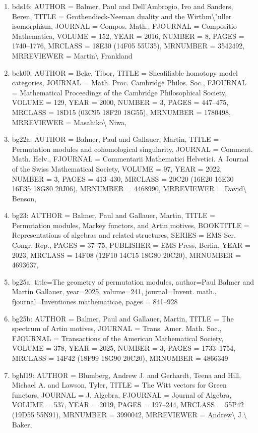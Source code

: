 \documentclass[11pt]{article}
\begin{document}
\begin{enumerate}[leftmargin=*]
  \item bds16: AUTHOR = Balmer, Paul and Dell'Ambrogio, Ivo and Sanders, Beren, TITLE = Grothendieck-Neeman duality and the Wirthm\textbackslash{}"uller isomorphism, JOURNAL = Compos. Math., FJOURNAL = Compositio Mathematica, VOLUME = 152, YEAR = 2016, NUMBER = 8, PAGES = 1740--1776, MRCLASS = 18E30 (14F05 55U35), MRNUMBER = 3542492, MRREVIEWER = Martin\textbackslash{} Frankland
  \item bek00: AUTHOR = Beke, Tibor, TITLE = Sheafifiable homotopy model categories, JOURNAL = Math. Proc. Cambridge Philos. Soc., FJOURNAL = Mathematical Proceedings of the Cambridge Philosophical Society, VOLUME = 129, YEAR = 2000, NUMBER = 3, PAGES = 447--475, MRCLASS = 18D15 (03C95 18F20 18G55), MRNUMBER = 1780498, MRREVIEWER = Masahiko\textbackslash{} Niwa,
  \item bg22a: AUTHOR = Balmer, Paul and Gallauer, Martin, TITLE = Permutation modules and cohomological singularity, JOURNAL = Comment. Math. Helv., FJOURNAL = Commentarii Mathematici Helvetici. A Journal of the Swiss Mathematical Society, VOLUME = 97, YEAR = 2022, NUMBER = 3, PAGES = 413--430, MRCLASS = 20C20 (16E20 16E30 16E35 18G80 20J06), MRNUMBER = 4468990, MRREVIEWER = David\textbackslash{} Benson,
  \item bg23: AUTHOR = Balmer, Paul and Gallauer, Martin, TITLE = Permutation modules, Mackey functors, and Artin motives, BOOKTITLE = Representations of algebras and related structures, SERIES = EMS Ser. Congr. Rep., PAGES = 37--75, PUBLISHER = EMS Press, Berlin, YEAR = 2023, MRCLASS = 14F08 (12F10 14C15 18G80 20C20), MRNUMBER = 4693637,
  \item bg25a: title=The geometry of permutation modules, author=Paul Balmer and Martin Gallauer, year=2025, volume=241, journal=Invent. math., fjournal=Inventiones mathematicae, pages = 841--928
  \item bg25b: AUTHOR = Balmer, Paul and Gallauer, Martin, TITLE = The spectrum of Artin motives, JOURNAL = Trans. Amer. Math. Soc., FJOURNAL = Transactions of the American Mathematical Society, VOLUME = 378, YEAR = 2025, NUMBER = 3, PAGES = 1733--1754, MRCLASS = 14F42 (18F99 18G90 20C20), MRNUMBER = 4866349
  \item bghl19: AUTHOR = Blumberg, Andrew J. and Gerhardt, Teena and Hill, Michael A. and Lawson, Tyler, TITLE = The Witt vectors for Green functors, JOURNAL = J. Algebra, FJOURNAL = Journal of Algebra, VOLUME = 537, YEAR = 2019, PAGES = 197--244, MRCLASS = 55P42 (19D55 55N91), MRNUMBER = 3990042, MRREVIEWER = Andrew\textbackslash{} J.\textbackslash{} Baker,

\end{enumerate}
\end{document}
